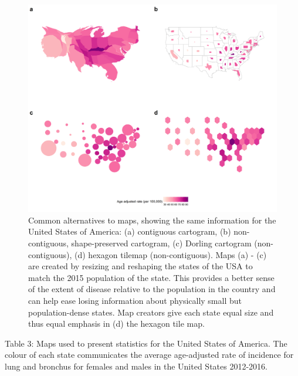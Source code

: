 \documentclass{monashthesis}
\begin{document}
\begin{figure}
\includegraphics[width=50in]{figures/02-literature/usa_grid} \caption{ Common alternatives to maps, showing the same information for the United States of America: (a) contiguous cartogram, (b) non-contiguous, shape-preserved cartogram, (c)  Dorling cartogram (non-contiguous), (d) hexagon tilemap (non-contiguous). Maps (a) - (c) are created by resizing and reshaping the states of the USA to match the 2015 population of the state. This provides a better sense of the extent of disease relative to the population in the country and can help ease losing information about physically small but population-dense states. Map creators give each state equal size and thus equal emphasis in (d) the hexagon tile map.}\label{fig:ggcartograms}
\end{figure}

Table 3: Maps used to present statistics for the United States of America. The colour of each state communicates the average age-adjusted rate of incidence for lung and bronchus for females and males in the United States 2012-2016.
\end{document}

